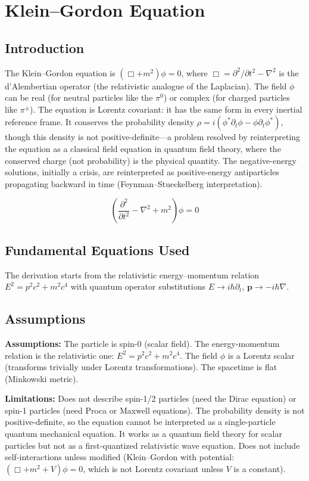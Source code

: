 \chapter{Klein--Gordon Equation}

\section*{Introduction}

The Klein--Gordon equation is $(\Box + m^2)\phi = 0$, where $\Box = \partial^2/\partial t^2 - \nabla^2$ is the d'Alembertian operator (the relativistic analogue of the Laplacian). The field $\phi$ can be real (for neutral particles like the $\pi^0$) or complex (for charged particles like $\pi^\pm$). The equation is Lorentz covariant: it has the same form in every inertial reference frame. It conserves the probability density $\rho = i(\phi^*\partial_t\phi - \phi\partial_t\phi^*)$, though this density is not positive-definite---a problem resolved by reinterpreting the equation as a classical field equation in quantum field theory, where the conserved charge (not probability) is the physical quantity. The negative-energy solutions, initially a crisis, are reinterpreted as positive-energy antiparticles propagating backward in time (Feynman--Stueckelberg interpretation).


\[
\left(\frac{\partial^2}{\partial t^2}-\nabla^2+m^2\right)\phi=0
\]

\section*{Fundamental Equations Used}

The derivation starts from the relativistic energy--momentum relation $E^2 = p^2c^2 + m^2c^4$ with quantum operator substitutions $E \to i\hbar\partial_t$, $\mathbf{p} \to -i\hbar\nabla$.

\section*{Assumptions}

\textbf{Assumptions:} The particle is spin-0 (scalar field). The energy-momentum relation is the relativistic one: $E^2 = p^2c^2 + m^2c^4$. The field $\phi$ is a Lorentz scalar (transforms trivially under Lorentz transformations). The spacetime is flat (Minkowski metric).


\textbf{Limitations:} Does not describe spin-1/2 particles (need the Dirac equation) or spin-1 particles (need Proca or Maxwell equations). The probability density is not positive-definite, so the equation cannot be interpreted as a single-particle quantum mechanical equation. It works as a quantum field theory for scalar particles but not as a first-quantized relativistic wave equation. Does not include self-interactions unless modified (Klein--Gordon with potential: $(\Box + m^2 + V)\phi = 0$, which is not Lorentz covariant unless $V$ is a constant).


